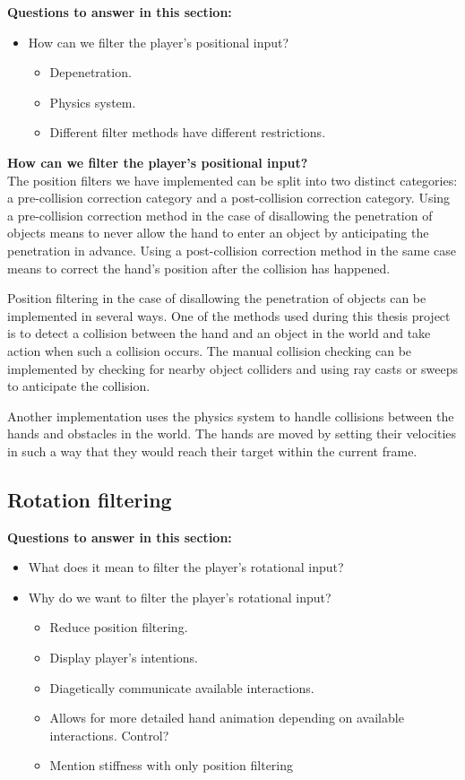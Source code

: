 \textbf{Questions to answer in this section:}
\begin{itemize}
\item How can we filter the player's positional input?
\begin{itemize}
\item Depenetration.
\item Physics system.
\item Different filter methods have different restrictions.
\end{itemize}
\end{itemize}

\textbf{How can we filter the player's positional input?}\\
The position filters we have implemented can be split into two distinct categories: a pre-collision correction category and a post-collision correction category. Using a pre-collision correction method in the case of disallowing the penetration of objects means to never allow the hand to enter an object by anticipating the penetration in advance. Using a post-collision correction method in the same case means to correct the hand's position after the collision has happened.

Position filtering in the case of disallowing the penetration of objects can be implemented in several ways. One of the methods used during this thesis project is to detect a collision between the hand and an object in the world and take action when such a collision occurs. The manual collision checking can be implemented by checking for nearby object colliders and using ray casts or sweeps to anticipate the collision.

Another implementation uses the physics system to handle collisions between the hands and obstacles in the world. The hands are moved by setting their velocities in such a way that they would reach their target within the current frame.

\subsection{Rotation filtering}
\label{subsec:categoryRotationFiltering}
\textbf{Questions to answer in this section:}
\begin{itemize}
\item What does it mean to filter the player's rotational input?
\item Why do we want to filter the player's rotational input?
\begin{itemize}
\item Reduce position filtering.
\item Display player's intentions.
\item Diagetically communicate available interactions.
\item Allows for more detailed hand animation depending on available interactions. Control?
\item Mention stiffness with only position filtering
\end{itemize}
\end{itemize}

